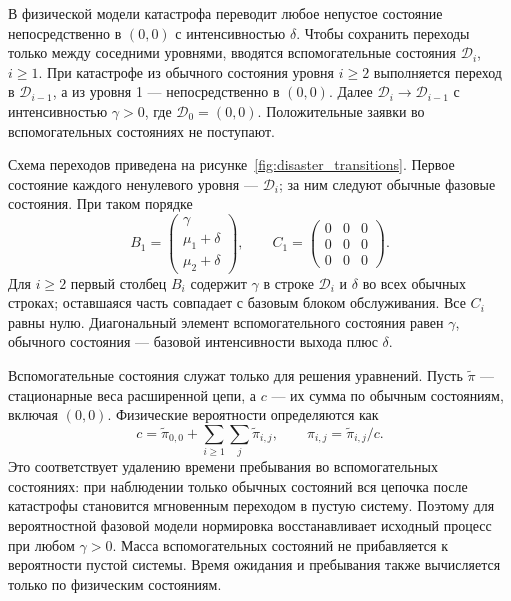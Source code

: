 В физической модели катастрофа переводит любое непустое состояние непосредственно в \((0,0)\) с интенсивностью \(\delta\). Чтобы сохранить переходы только между соседними уровнями, вводятся вспомогательные состояния \(\mathcal{D}_i\), \(i\ge1\). При катастрофе из обычного состояния уровня \(i\ge2\) выполняется переход в \(\mathcal{D}_{i-1}\), а из уровня 1 --- непосредственно в \((0,0)\). Далее \(\mathcal{D}_i\to \mathcal{D}_{i-1}\) с интенсивностью \(\gamma>0\), где \(\mathcal{D}_0=(0,0)\). Положительные заявки во вспомогательных состояниях не поступают.

Схема переходов приведена на рисунке~\ref{fig:disaster_transitions}. Первое состояние каждого ненулевого уровня --- \(\mathcal{D}_i\); за ним следуют обычные фазовые состояния. При таком порядке
\[
B_1=\begin{pmatrix}\gamma\\\mu_1+\delta\\\mu_2+\delta\end{pmatrix},\qquad
C_1=\begin{pmatrix}0&0&0\\0&0&0\\0&0&0\end{pmatrix}.
\]
Для \(i\ge2\) первый столбец \(B_i\) содержит \(\gamma\) в строке \(\mathcal{D}_i\) и \(\delta\) во всех обычных строках; оставшаяся часть совпадает с базовым блоком обслуживания. Все \(C_i\) равны нулю. Диагональный элемент вспомогательного состояния равен \(\gamma\), обычного состояния --- базовой интенсивности выхода плюс \(\delta\).

Вспомогательные состояния служат только для решения уравнений. Пусть \(\widetilde\pi\) --- стационарные веса расширенной цепи, а \(c\) --- их сумма по обычным состояниям, включая \((0,0)\). Физические вероятности определяются как
\[
c=\widetilde\pi_{0,0}+\sum_{i\ge1}\sum_j\widetilde\pi_{i,j},\qquad
\pi_{i,j}=\widetilde\pi_{i,j}/c.
\]
Это соответствует удалению времени пребывания во вспомогательных состояниях: при наблюдении только обычных состояний вся цепочка после катастрофы становится мгновенным переходом в пустую систему. Поэтому для вероятностной фазовой модели нормировка восстанавливает исходный процесс при любом \(\gamma>0\). Масса вспомогательных состояний не прибавляется к вероятности пустой системы. Время ожидания и пребывания также вычисляется только по физическим состояниям. 

